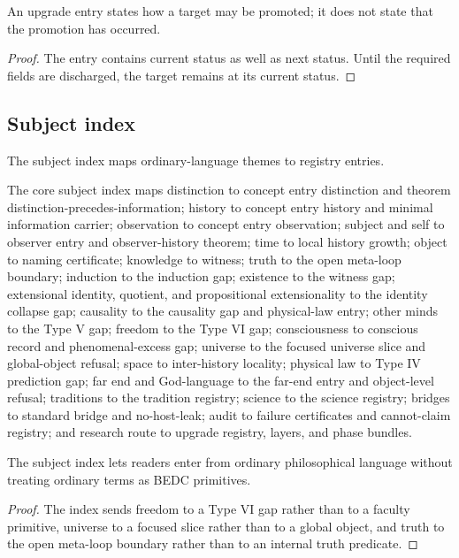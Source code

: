 \begin{theorem}
\label{thm:philosophy-upgrade-registry-not-completion}
An upgrade entry states how a target may be promoted; it does not state
that the promotion has occurred.
\end{theorem}
\begin{proof}
The entry contains current status as well as next status. Until the
required fields are discharged, the target remains at its current
status.
\end{proof}

\subsection{Subject index}
\label{subsec:philosophy-subject-index}

\begin{definition}
\label{def:philosophy-subject-index}
The subject index maps ordinary-language themes to registry entries.
\end{definition}

\begin{definition}
\label{def:philosophy-core-subject-index}
The core subject index maps distinction to concept entry distinction
and theorem distinction-precedes-information; history to concept entry
history and minimal information carrier; observation to concept entry
observation; subject and self to observer entry and observer-history
theorem; time to local history growth; object to naming certificate;
knowledge to witness; truth to the open meta-loop boundary; induction
to the induction gap; existence to the witness gap; extensional
identity, quotient, and propositional extensionality to the identity
collapse gap; causality to the causality gap and physical-law entry;
other minds to the Type V gap; freedom to the Type VI gap;
consciousness to conscious record and phenomenal-excess gap; universe
to the focused universe slice and global-object refusal; space to
inter-history locality; physical law to Type IV prediction gap; far end
and God-language to the far-end entry and object-level refusal;
traditions to the tradition registry; science to the science registry;
bridges to standard bridge and no-host-leak; audit to failure
certificates and cannot-claim registry; and research route to upgrade
registry, layers, and phase bundles.
\end{definition}

\begin{theorem}
\label{thm:philosophy-subject-index-reading-entrance}
The subject index lets readers enter from ordinary philosophical
language without treating ordinary terms as BEDC primitives.
\end{theorem}
\begin{proof}
The index sends freedom to a Type VI gap rather than to a faculty
primitive, universe to a focused slice rather than to a global object,
and truth to the open meta-loop boundary rather than to an internal
truth predicate.
\end{proof}
